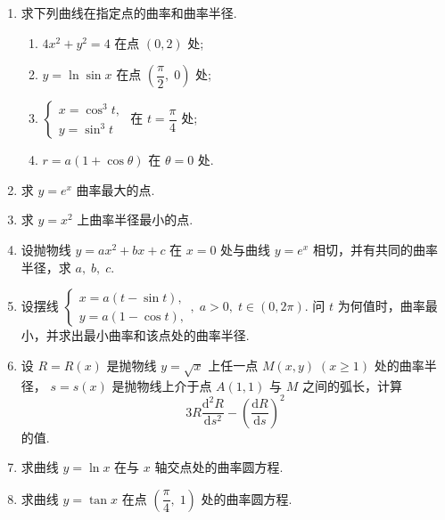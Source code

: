 \begin{enumerate}\setlength{\itemsep}{7pt}
    \item 求下列曲线在指定点的曲率和曲率半径.
    \begin{enumerate}[(1)]\setlength{\itemsep}{5pt}\setlength{\topsep}{15pt}
        \item $4x^2+y^2=4$ 在点 $(0,2)$ 处;
        \item $y=\ln\sin x$ 在点 $\left(\dfrac{\pi}{2},\;0\right)$ 处;
        \item $\begin{cases}
            x=\cos^3t,\\
            y=\sin^3t
        \end{cases}$ 在 $t=\dfrac{\pi}{4}$ 处;
        \item $r=a(1+\cos \theta)$ 在 $\theta=0$ 处.
    \end{enumerate}

    \item 求 $y=e^x$ 曲率最大的点. 
    
    \item 求 $y=x^2$ 上曲率半径最小的点.
    
    \item 设抛物线 $y=ax^2+bx+c$ 在 $x=0$ 处与曲线 $y=e^x$ 相切，并有共同的曲率半径，求 $a,\;b,\;c$.
    
    \item 设摆线 $\begin{cases}
        x=a(t-\sin t),\\
        y=a(1-\cos t),
    \end{cases},\;a>0,\;t\in(0,2\pi)$. 问 $t$ 为何值时，曲率最小，并求出最小曲率和该点处的曲率半径.

    \item 设 $R=R(x)$ 是抛物线  $y=\sqrt{x}$ 上任一点 $M(x, y)\;(x\geqslant 1)$ 处的曲率半径，
    $s=s(x)$ 是抛物线上介于点 $A(1,1)$ 与 $M$ 之间的弧长，计算
    \[
        3R\dfrac{\text{d}^2R}{\text{d}s^2}-\left(\dfrac{\text{d}R}{\text{d}s}\right)^2
    \]
    的值.

    \item 求曲线 $y=\ln x$ 在与 $x$ 轴交点处的曲率圆方程.
    
    \item 求曲线 $y=\tan x$ 在点 $\left(\dfrac{\pi}{4},\;1\right)$ 处的曲率圆方程.

\end{enumerate}